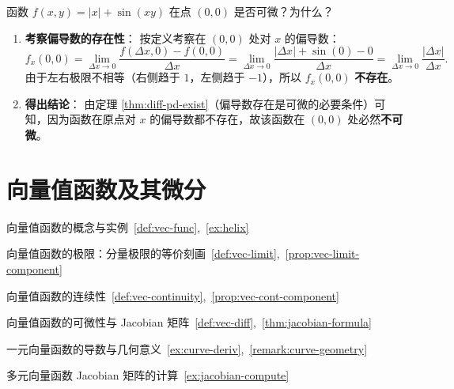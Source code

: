 \documentclass[lang=cn,11pt]{elegantbook}
\begin{document}
\begin{exercise}[绝对值与函数可微性]
函数 $f(x,y) = |x|+\sin(xy)$ 在点 $(0,0)$ 是否可微？为什么？
\end{exercise}
\begin{solution}
\begin{enumerate}
  \item \textbf{考察偏导数的存在性}：
  按定义考察在 $(0,0)$ 处对 $x$ 的偏导数：
  \[
  f_x(0,0) = \lim_{\Delta x \to 0} \frac{f(\Delta x, 0) - f(0,0)}{\Delta x} = \lim_{\Delta x \to 0} \frac{|\Delta x| + \sin(0) - 0}{\Delta x} = \lim_{\Delta x \to 0} \frac{|\Delta x|}{\Delta x}.
  \]
  由于左右极限不相等（右侧趋于 $1$，左侧趋于 $-1$），所以 $f_x(0,0)$ \textbf{不存在}。
  \item \textbf{得出结论}：
  由定理 \ref{thm:diff-pd-exist}（偏导数存在是可微的必要条件）可知，因为函数在原点对 $x$ 的偏导数都不存在，故该函数在 $(0,0)$ 处必然\textbf{不可微}。
\end{enumerate}
\end{solution}



















\section{向量值函数及其微分}

\begin{introduction}
  \item 向量值函数的概念与实例~\ref{def:vec-func},~\ref{ex:helix}
  \item 向量值函数的极限：分量极限的等价刻画~\ref{def:vec-limit},~\ref{prop:vec-limit-component}
  \item 向量值函数的连续性~\ref{def:vec-continuity},~\ref{prop:vec-cont-component}
  \item 向量值函数的可微性与 Jacobian 矩阵~\ref{def:vec-diff},~\ref{thm:jacobian-formula}
  \item 一元向量函数的导数与几何意义~\ref{ex:curve-deriv},~\ref{remark:curve-geometry}
  \item 多元向量函数 Jacobian 矩阵的计算~\ref{ex:jacobian-compute}
\end{introduction}
\end{document}

